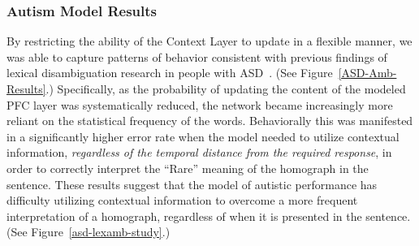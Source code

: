 \subsubsection{Autism Model Results}
By restricting the ability of the Context Layer to update in a flexible manner, we was able to capture patterns of behavior consistent with previous findings of lexical disambiguation research in people with ASD~\cite{RefWorks:103,HappeF:1997:WCC_Homographs}. (See Figure~\ref{ASD-Amb-Results}.) Specifically, as the probability of updating the content of the modeled PFC layer was systematically reduced, the network became increasingly more reliant on the statistical frequency of the words.  Behaviorally this was manifested in a significantly higher error rate when the model needed to utilize contextual information, \emph{regardless of the temporal distance from the required response}, in order to correctly interpret the ``Rare'' meaning of the homograph in the sentence.  These results suggest that the model of autistic performance has difficulty utilizing contextual information to overcome a more frequent interpretation of a homograph, regardless of when it is presented in the sentence.  (See Figure~\ref{asd-lexamb-study}.) 


